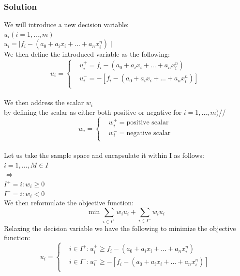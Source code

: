 \documentclass[12pt]{article}
\begin{document}
    \subsubsection{Solution}
    We will introduce a new decision variable:\\
    \( u_i (i=1,...,m) \)\\
    \( u_i = \mid f_i - (a_0 + a_ix_i + ...+ a_nx_i^n) \mid \)\\
    We then define the introduced variable as the following:\\
    \begin{equation*}
        u_i = 
        \begin{cases}
            &u_i^+ = f_i - (a_0 + a_ix_i + ...+ a_nx_i^n)\\
            &u_i^- = -[f_i - (a_0 + a_ix_i + ...+ a_nx_i^n)]\\
        \end{cases}
    \end{equation*}\\
    We then address the scalar \( w_i \)\\ by defining the scalar as either both positive or negative for \( i=1,...,m) \)//
        \begin{equation*}
            w_i = 
            \begin{cases}
                &w_i^+ = \text{positive scalar}\\
                &w_i^- = \text{negative scalar}\\
            \end{cases}
        \end{equation*}\\
    Let us take the sample space and encapsulate it within I as follows:\\
    \( i=1,...,M \in I\)\\ 
    \( \Longleftrightarrow \)\\
    \( I^+ = i: w_i \geq 0\)\\
    \( I^- = i: w_i < 0 \)\\
    We then reformulate the objective function:\\
    \begin{equation*}
        \min \sum_{i \in I^+} w_i u_i + \sum_{i \in I^-} w_iu_i
    \end{equation*}
    Relaxing the decision variable we have the following to minimize the objective function:\\
    \begin{equation*}
        u_i = 
        \begin{cases}
            &i \in I^+ : u_i^+ \geq f_i - (a_0 + a_ix_i + ...+ a_nx_i^n)\\
            &i \in I^- : u_i^- \geq -[f_i - (a_0 + a_ix_i + ...+ a_nx_i^n)]\\
        \end{cases}
    \end{equation*}\\
\end{document}
